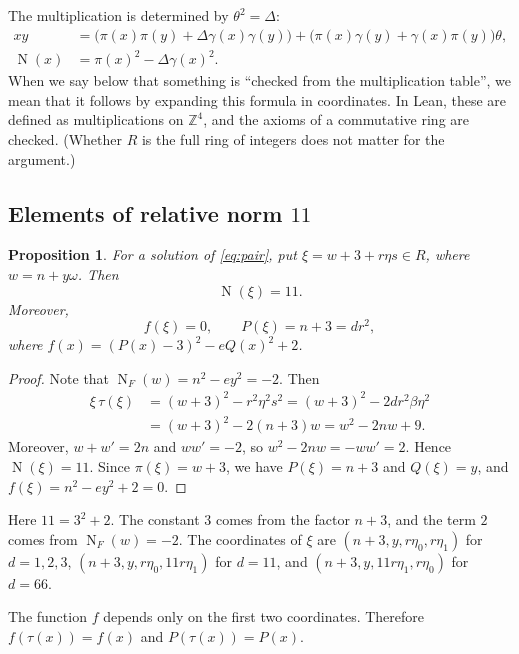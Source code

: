 \documentclass[a4paper,11pt]{article}
\theoremstyle{plain}
\newtheorem{proposition}[theorem]{Proposition}
\theoremstyle{definition}
\theoremstyle{remark}
\numberwithin{equation}{section}
\numberwithin{table}{section}
\newcommand{\Z}{\mathbb{Z}}
\newcommand{\Nm}{\operatorname{N}}
\newcommand{\NF}{\operatorname{N}_F}
\newcommand{\tsec}[2]{\texorpdfstring{#1}{#2}}
\begin{document}
The multiplication is determined by $\theta^2=\Delta$:
\begin{equation}\label{eq:mult}
\begin{aligned}
xy&=\bigl(\pi(x)\pi(y)+\Delta\gamma(x)\gamma(y)\bigr)+\bigl(\pi(x)\gamma(y)+\gamma(x)\pi(y)\bigr)\theta,\\
\Nm(x)&=\pi(x)^2-\Delta\gamma(x)^2.
\end{aligned}
\end{equation}
When we say below that something is ``checked from the multiplication table'', we mean that it follows by expanding this formula in coordinates.
In Lean, these are defined as multiplications on $\Z^4$, and the axioms of a commutative ring are checked.
(Whether $R$ is the full ring of integers does not matter for the argument.)

\subsection{Elements of relative norm \tsec{$11$}{11}}

\begin{proposition}\label{prop:xi}
For a solution of \eqref{eq:pair}, put $\xi=w+3+r\eta s\in R$, where $w=n+y\omega$. Then
\begin{equation}\label{eq:norm11}
\Nm(\xi)=11.
\end{equation}
Moreover,
\begin{equation}\label{eq:f}
f(\xi)=0,\qquad P(\xi)=n+3=dr^2,
\end{equation}
where $f(x)=(P(x)-3)^2-eQ(x)^2+2$.
\end{proposition}

\begin{proof}
Note that $\NF(w)=n^2-ey^2=-2$. Then
\begin{align*}
\xi\,\tau(\xi)&=(w+3)^2-r^2\eta^2s^2=(w+3)^2-2dr^2\beta\eta^2\\
&=(w+3)^2-2(n+3)w=w^2-2nw+9.
\end{align*}
Moreover, $w+w'=2n$ and $ww'=-2$, so $w^2-2nw=-ww'=2$. Hence $\Nm(\xi)=11$.
Since $\pi(\xi)=w+3$, we have $P(\xi)=n+3$ and $Q(\xi)=y$, and $f(\xi)=n^2-ey^2+2=0$.
\end{proof}

Here $11=3^2+2$. The constant $3$ comes from the factor $n+3$, and the term $2$ comes from $\NF(w)=-2$.
The coordinates of $\xi$ are $(n+3,y,r\eta_0,r\eta_1)$ for $d=1,2,3$, $(n+3,y,r\eta_0,11r\eta_1)$ for $d=11$, and $(n+3,y,11r\eta_1,r\eta_0)$ for $d=66$.

The function $f$ depends only on the first two coordinates. Therefore $f(\tau(x))=f(x)$ and $P(\tau(x))=P(x)$.
\end{document}
